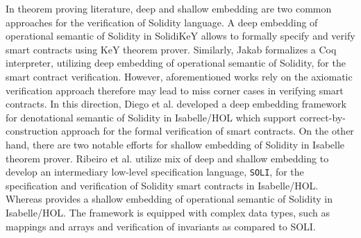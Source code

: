 \documentclass[a4paper,UKenglish,cleveref, autoref, thm-restate]{oasics-v2021}
\begin{document}
In theorem proving literature, deep and shallow embedding are two common approaches for the verification of Solidity language. A deep embedding of operational semantic of Solidity in SolidiKeY \cite{ahrendt2020functional} allows to formally specify and verify smart contracts using KeY theorem prover. Similarly, Jakab \cite{zakrzewski2018towards} formalizes a Coq interpreter, utilizing deep embedding of operational semantic of Solidity, for the smart contract verification. However, aforementioned works rely on the axiomatic verification approach therefore may lead to miss corner cases in verifying smart contracts. In this direction, Diego et al. \cite{marmsoler2022isabelle}  developed a deep embedding framework for denotational semantic of Solidity in Isabelle/HOL which support correct-by-construction approach for the formal verification of smart contracts. On the other hand, there are two notable efforts for shallow embedding of Solidity in Isabelle theorem prover. Ribeiro et al. \cite{ribeiro2020formal} utilize mix of deep and shallow embedding to develop an intermediary low-level specification language, \texttt{SOLI}, for the specification and verification of Solidity smart contracts in Isabelle/HOL. Whereas \cite{marmsoler2024secure} provides a shallow embedding of operational semantic of Solidity in Isabelle/HOL. The framework is equipped with complex data types, such as mappings and arrays and verification of invariants as compared to SOLI.
\end{document}
